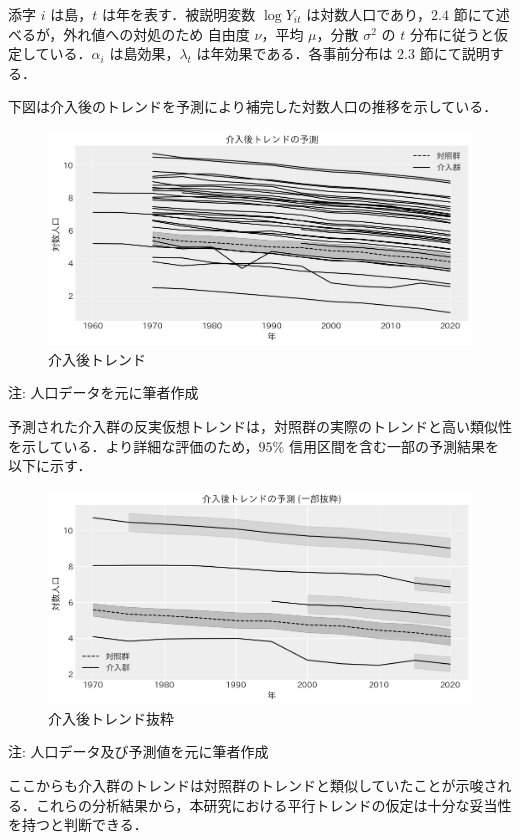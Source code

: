 添字 \(i\) は島，\(t\) は年を表す．被説明変数 \(\log{Y_{it}}\)
は対数人口であり，\(2.4\) 節にて述べるが，外れ値への対処のため 自由度
\(\nu\)，平均 \(\mu\)，分散 \(\sigma^2\) の \(t\)
分布に従うと仮定している．\(\alpha_i\) は島効果，\(\lambda_t\)
は年効果である．各事前分布は \(2.3\) 節にて説明する．

下図は介入後のトレンドを予測により補完した対数人口の推移を示している．

\begin{figure}
\centering
\includegraphics{../figures/post_trend.png}
\caption{介入後トレンド}
\end{figure}

注: 人口データを元に筆者作成

予測された介入群の反実仮想トレンドは，対照群の実際のトレンドと高い類似性を示している．より詳細な評価のため，\(95\%\)
信用区間を含む一部の予測結果を以下に示す．

\begin{figure}
\centering
\includegraphics{../figures/post_trend_sample.png}
\caption{介入後トレンド抜粋}
\end{figure}

注: 人口データ及び予測値を元に筆者作成

ここからも介入群のトレンドは対照群のトレンドと類似していたことが示唆される．これらの分析結果から，本研究における平行トレンドの仮定は十分な妥当性を持つと判断できる．

